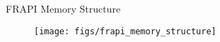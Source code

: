 \begin{frame}{FRAPI Memory Structure}

  \scriptsize

  \begin{figure}[h]
    \texttt{[image: figs/frapi\_memory\_structure]}
  \end{figure}  

\end{frame}